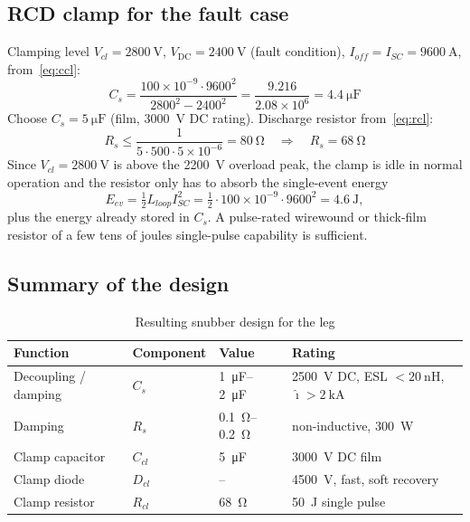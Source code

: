 \documentclass[11pt,a4paper]{article}
\newcommand{\Vdc}{V_{\mathrm{DC}}}
\begin{document}
\subsection{RCD clamp for the fault case}

Clamping level $V_{cl}=\SI{2800}{\volt}$, $\Vdc = \SI{2400}{\volt}$ (fault
condition), $I_{off}=I_{SC}=\SI{9600}{\ampere}$, from~\eqref{eq:ccl}:
\begin{equation}
C_s = \frac{100\times10^{-9}\cdot 9600^{2}}{2800^{2}-2400^{2}}
    = \frac{9.216}{2.08\times10^{6}}
    = \SI{4.4}{\micro\farad}
\end{equation}
Choose $C_s = \SI{5}{\micro\farad}$ (film, \SI{3000}{\volt} DC rating).
Discharge resistor from~\eqref{eq:rcl}:
\begin{equation}
R_s \le \frac{1}{5\cdot 500\cdot 5\times10^{-6}} = \SI{80}{\ohm}
\quad\Rightarrow\quad R_s = \SI{68}{\ohm}
\end{equation}
Since $V_{cl}=\SI{2800}{\volt}$ is above the \SI{2200}{\volt} overload peak,
the clamp is idle in normal operation and the resistor only has to absorb the
single-event energy
\begin{equation}
E_{ev} = \tfrac{1}{2} L_{loop} I_{SC}^{2}
= \tfrac{1}{2}\cdot 100\times10^{-9}\cdot 9600^{2} = \SI{4.6}{\joule},
\end{equation}
plus the energy already stored in $C_s$. A pulse-rated wirewound or thick-film
resistor of a few tens of joules single-pulse capability is sufficient.

\subsection{Summary of the design}

\begin{table}[htbp]
\centering
\caption{Resulting snubber design for the leg}
\label{tab:result}
\begin{tabular}{llll}
\toprule
Function & Component & Value & Rating \\
\midrule
Decoupling / damping & $C_s$ & \SIrange{1}{2}{\micro\farad} & \SI{2500}{\volt} DC, ESL $<\SI{20}{\nano\henry}$, $\hat\imath > \SI{2}{\kilo\ampere}$ \\
Damping              & $R_s$ & \SIrange{0.1}{0.2}{\ohm}     & non-inductive, \SI{300}{\watt} \\
Clamp capacitor      & $C_{cl}$ & \SI{5}{\micro\farad}      & \SI{3000}{\volt} DC film \\
Clamp diode          & $D_{cl}$ & --                        & \SI{4500}{\volt}, fast, soft recovery \\
Clamp resistor       & $R_{cl}$ & \SI{68}{\ohm}             & \SI{50}{\joule} single pulse \\
\bottomrule
\end{tabular}
\end{table}
\end{document}
